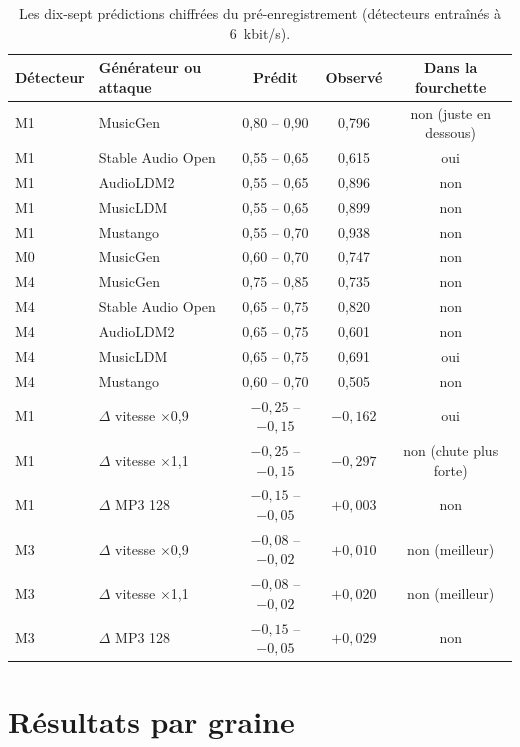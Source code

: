 \documentclass[a4paper, 11pt]{article}
\begin{document}
\begin{table}[H]
    \centering
    \small
    \begin{tabular}{llccc}
        \toprule
        Détecteur & Générateur ou attaque & Prédit & Observé & Dans la fourchette \\
        \midrule
        M1 & MusicGen          & 0,80 -- 0,90 & 0,796 & non (juste en dessous) \\
        M1 & Stable Audio Open & 0,55 -- 0,65 & 0,615 & oui \\
        M1 & AudioLDM2         & 0,55 -- 0,65 & 0,896 & non \\
        M1 & MusicLDM          & 0,55 -- 0,65 & 0,899 & non \\
        M1 & Mustango          & 0,55 -- 0,70 & 0,938 & non \\
        M0 & MusicGen          & 0,60 -- 0,70 & 0,747 & non \\
        M4 & MusicGen          & 0,75 -- 0,85 & 0,735 & non \\
        M4 & Stable Audio Open & 0,65 -- 0,75 & 0,820 & non \\
        M4 & AudioLDM2         & 0,65 -- 0,75 & 0,601 & non \\
        M4 & MusicLDM          & 0,65 -- 0,75 & 0,691 & oui \\
        M4 & Mustango          & 0,60 -- 0,70 & 0,505 & non \\
        \midrule
        M1 & $\Delta$ vitesse $\times$0,9 & $-0{,}25$ -- $-0{,}15$ & $-0{,}162$ & oui \\
        M1 & $\Delta$ vitesse $\times$1,1 & $-0{,}25$ -- $-0{,}15$ & $-0{,}297$ & non (chute plus forte) \\
        M1 & $\Delta$ MP3 128             & $-0{,}15$ -- $-0{,}05$ & $+0{,}003$ & non \\
        M3 & $\Delta$ vitesse $\times$0,9 & $-0{,}08$ -- $-0{,}02$ & $+0{,}010$ & non (meilleur) \\
        M3 & $\Delta$ vitesse $\times$1,1 & $-0{,}08$ -- $-0{,}02$ & $+0{,}020$ & non (meilleur) \\
        M3 & $\Delta$ MP3 128             & $-0{,}15$ -- $-0{,}05$ & $+0{,}029$ & non \\
        \bottomrule
    \end{tabular}
    \caption{Les dix-sept prédictions chiffrées du pré-enregistrement (détecteurs entraînés à 6~kbit/s).}
\end{table}

\section{Résultats par graine}
\label{app:graines}
\end{document}
